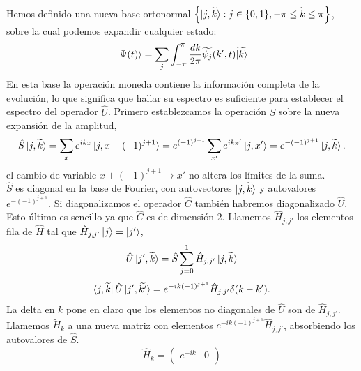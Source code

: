 \begin{appendix}
Hemos definido una nueva base ortonormal $\left\{\ket{j,\widetilde{k}}:j\in\{0,1\},-\pi\leq \widetilde{k}\leq\pi\right\}$, sobre la cual podemos expandir cualquier estado:
\begin{equation}{}
\ket{\Psi(t)}=\sum_j\int_{-\pi}^\pi\frac{dk}{2\pi}\widetilde{\psi_j}(k',t)\widetilde{\ket{k}}
\end{equation}
En esta base la operación moneda contiene la información completa de la evolución, lo que significa que hallar su espectro es suficiente para establecer el espectro del operador $\hat{U}$. Primero establezcamos la operación $\hat{S}$ sobre la nueva expansión de la amplitud,
\begin{equation}
    \hat{S}\ket{j,\widetilde{k}}=\sum_xe^{ikx}\ket{j,x+(-1)^{j+1}}=e^{(-1)^{j+1}}\sum_{x'}e^{ikx'}\ket{j,x'}=e^{-(-1)^{j+1}}\ket{j,\widetilde{k}}.
\end{equation}{}
el cambio de variable $x+(-1)^{j+1}\xrightarrow{}x'$ no altera los límites de la suma.\\
$\hat{S}$ es diagonal en la base de Fourier, con autovectores $\ket{j,\widetilde{k}}$ y autovalores $e^{-(-1)^{j+1}}$. Si diagonalizamos el operador $\hat{C}$ también habremos diagonalizado $\hat{U}$. Esto último es sencillo ya que $\hat{C}$ es de dimensión 2. Llamemos $\hat{H}_{j,j'}$ los elementos fila de $\hat{H}$ tal que $\hat{H}_{j,j'}\ket{j}=\ket{j'}$,
\begin{equation}
    \hat{U}\ket{j',\widetilde{k}}=\hat{S}\sum_{j=0}^1\hat{H}_{j,j'}\ket{j,\widetilde{k}}
\end{equation}{}
\begin{equation}
    \bra{j,\widetilde{k}}\hat{U}\ket{j',\widetilde{k'}}=e^{-ik(-1)^{j+1}}\hat{H}_{j,j'}\delta(k-k').
\end{equation}{}
La delta en $k$ pone en claro que los elementos no diagonales de $\hat{U}$ son de $\hat{H}_{j,j'}$. Llamemos $\widetilde{H}_k$ a una nueva matriz con elementos $e^{-ik(-1)^{j+1}}\hat{H}_{j,j'}$, absorbiendo los autovalores de $\hat{S}$.
\begin{equation*}
\hat{H}_k=
\begin{pmatrix}
e^{-ik} & 0\\

\end{pmatrix}
\end{equation*}
\end{appendix}
